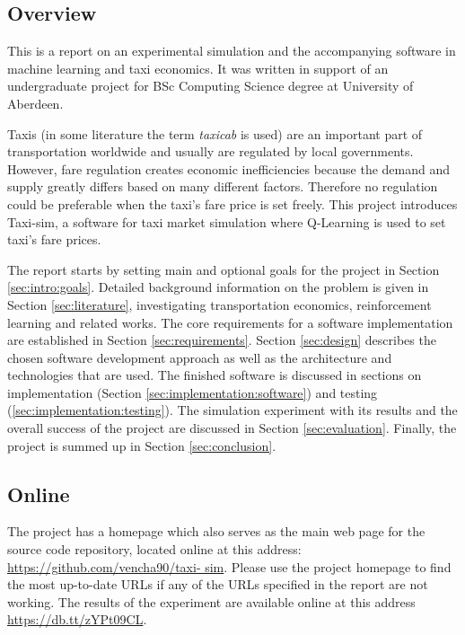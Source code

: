 \subsection{Overview}
\label{sec:intro:overview}

This is a report on an experimental simulation and the accompanying software in
machine learning and taxi economics. It was written in support of an
undergraduate project for BSc Computing Science degree at University of
Aberdeen.

Taxis (in some literature the term \textit{taxicab} is used) are an important
part of transportation worldwide and usually are regulated by local
governments. However, fare regulation creates economic inefficiencies because
the demand and supply greatly differs based on many different factors.
Therefore no regulation could be preferable when the taxi's fare price is set
freely. This project introduces Taxi-sim, a software for taxi market simulation
where Q-Learning is used to set taxi's fare prices.

The report starts by setting main and optional goals for the project in Section
\ref{sec:intro:goals}. Detailed background information on the problem is given
in Section \ref{sec:literature}, investigating transportation economics,
reinforcement learning and related works. The core requirements for a software
implementation are established in Section \ref{sec:requirements}. Section
\ref{sec:design} describes the chosen software development approach as well as
the architecture and technologies that are used. The finished software is
discussed in sections on implementation (Section
\ref{sec:implementation:software}) and testing
(\ref{sec:implementation:testing}). The simulation experiment with its results
and the overall success of the project are discussed in Section
\ref{sec:evaluation}. Finally, the project is summed up in Section
\ref{sec:conclusion}.

\subsection{Online}
\label{sec:intro:online}

The project has a homepage which also serves as the main web page for the
source code repository, located online at this address:
\url{https://github.com/vencha90/taxi- sim}. Please use the project homepage to
find the most up-to-date URLs if any of the URLs specified in the report are
not working. The results of the experiment are available online at this address
\url{https://db.tt/zYPt09CL}.
